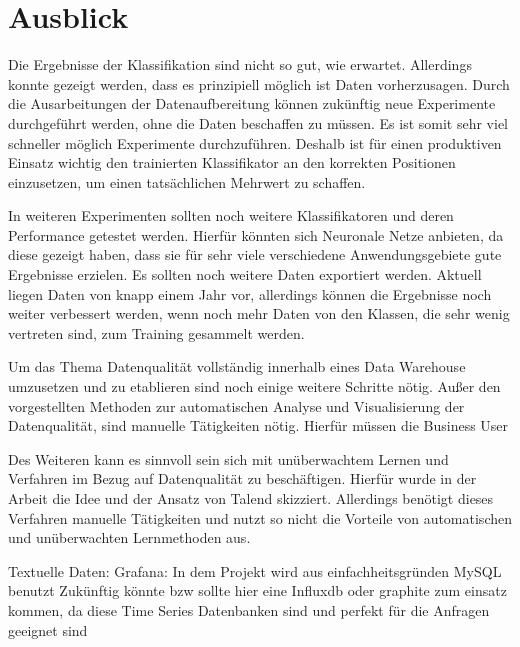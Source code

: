 \chapter{Ausblick}\label{ch:outlook}
Die Ergebnisse der Klassifikation sind nicht so gut, wie erwartet. 
Allerdings konnte gezeigt werden, dass es prinzipiell möglich ist Daten vorherzusagen.
Durch die Ausarbeitungen der Datenaufbereitung können zukünftig neue Experimente durchgeführt werden, ohne die Daten beschaffen zu müssen. 
Es ist somit sehr viel schneller möglich Experimente durchzuführen.
Deshalb ist für einen produktiven Einsatz wichtig den trainierten Klassifikator an den korrekten Positionen einzusetzen, um einen tatsächlichen Mehrwert zu schaffen.


In weiteren Experimenten sollten noch weitere Klassifikatoren und deren Performance getestet werden.
Hierfür könnten sich Neuronale Netze anbieten, da diese gezeigt haben, dass sie für sehr viele verschiedene Anwendungsgebiete gute Ergebnisse erzielen.
Es sollten noch weitere Daten exportiert werden. 
Aktuell liegen Daten von knapp einem Jahr vor, allerdings können die Ergebnisse noch weiter verbessert werden, wenn noch mehr Daten von den Klassen, die sehr wenig vertreten sind, zum Training gesammelt werden. 


Um das Thema Datenqualität vollständig innerhalb eines Data Warehouse umzusetzen und zu etablieren sind noch einige weitere Schritte nötig.
Außer den vorgestellten Methoden zur automatischen Analyse und Visualisierung der Datenqualität, sind manuelle Tätigkeiten nötig.
Hierfür müssen die Business User 


Des Weiteren kann es sinnvoll sein sich mit unüberwachtem Lernen und Verfahren im Bezug auf Datenqualität zu beschäftigen.
Hierfür wurde in der Arbeit die Idee und der Ansatz von Talend skizziert. 
Allerdings benötigt dieses Verfahren manuelle Tätigkeiten und nutzt so nicht die Vorteile von automatischen und unüberwachten Lernmethoden aus. 





Textuelle Daten: 
Grafana:
In dem Projekt wird aus einfachheitsgründen MySQL benutzt
Zukünftig könnte bzw sollte hier eine Influxdb oder graphite zum einsatz kommen, da diese Time Series Datenbanken sind und perfekt für die Anfragen geeignet sind

